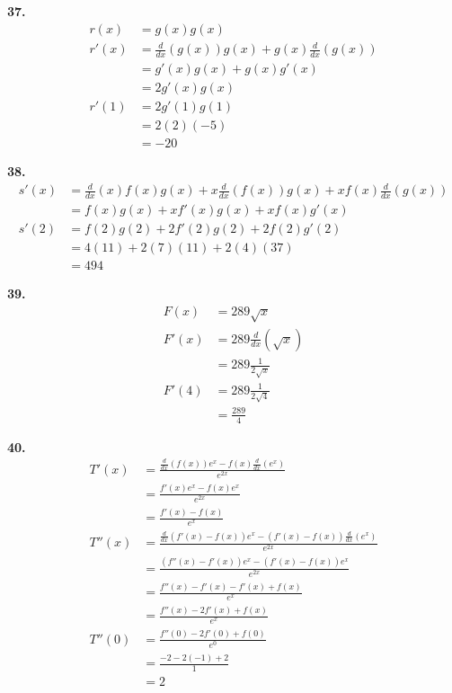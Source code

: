 \documentclass[10pt,oneside,]{book}
\theoremstyle{plain}
\theoremstyle{definition}
\numberwithin{equation}{section}
\newcommand{\fe}[2]{#1\mathopen{}\left(#2\right)\mathclose{}}
\newcommand{\fd}[1]{#1'}
\newcommand{\sd}[1]{#1''}
\newcommand{\lzoo}[2]{{\frac{d}{d#1}}{\left(#2\right)}}
\begin{document}
\par\smallskip
\noindent\textbf{37.}\quad{}\begin{align*}
\fe{r}{x}&=\fe{g}{x}\fe{g}{x}\\
\fe{\fd{r}}{x}&=\lzoo{x}{\fe{g}{x}}\fe{g}{x}+\fe{g}{x}\lzoo{x}{\fe{g}{x}}\\
&=\fe{\fd{g}}{x}\fe{g}{x}+\fe{g}{x}\fe{\fd{g}}{x}\\
&=2\fe{\fd{g}}{x}\fe{g}{x}\\
\fe{\fd{r}}{1}&=2\fe{\fd{g}}{1}\fe{g}{1}\\
&=2(2)(-5)\\
&=-20
\end{align*}%
\par\smallskip
\noindent\textbf{38.}\quad{}\begin{align*}
\fe{\fd{s}}{x}&=\lzoo{x}{x}\fe{f}{x}\fe{g}{x}+x\lzoo{x}{\fe{f}{x}}\fe{g}{x}+x\fe{f}{x}\lzoo{x}{\fe{g}{x}}\\
&=\fe{f}{x}\fe{g}{x}+x\fe{\fd{f}}{x}\fe{g}{x}+x\fe{f}{x}\fe{\fd{g}}{x}\\
\fe{\fd{s}}{2}&=\fe{f}{2}\fe{g}{2}+2\fe{\fd{f}}{2}\fe{g}{2}+2\fe{f}{2}\fe{\fd{g}}{2}\\
&=4(11)+2(7)(11)+2(4)(37)\\
&=494
\end{align*}%
\par\smallskip
\noindent\textbf{39.}\quad{}\begin{align*}
\fe{F}{x}&=289\sqrt{x}\\
\fe{\fd{F}}{x}&=289\lzoo{x}{\sqrt{x}}\\
&=289\frac{1}{2\sqrt{x}}\\
\fe{\fd{F}}{4}&=289\frac{1}{2\sqrt{4}}\\
&=\frac{289}{4}
\end{align*}%
\par\smallskip
\noindent\textbf{40.}\quad{}\begin{align*}
\fe{\fd{T}}{x}&=\frac{\lzoo{x}{\fe{f}{x}}e^x-\fe{f}{x}\lzoo{x}{e^x}}{e^{2x}}\\
&=\frac{\fe{\fd{f}}{x}e^x-\fe{f}{x}e^x}{e^{2x}}\\
&=\frac{\fe{\fd{f}}{x}-\fe{f}{x}}{e^x}\\
\fe{\sd{T}}{x}&=\frac{\lzoo{x}{\fe{\fd{f}}{x}-\fe{f}{x}}e^x-\left(\fe{\fd{f}}{x}-\fe{f}{x}\right)\lzoo{x}{e^x}}{e^{2x}}\\
&=\frac{\left(\fe{\sd{f}}{x}-\fe{\fd{f}}{x}\right)e^x-\left(\fe{\fd{f}}{x}-\fe{f}{x}\right)e^x}{e^{2x}}\\
&=\frac{\fe{\sd{f}}{x}-\fe{\fd{f}}{x}-\fe{\fd{f}}{x}+\fe{f}{x}}{e^x}\\
&=\frac{\fe{\sd{f}}{x}-2\fe{\fd{f}}{x}+\fe{f}{x}}{e^x}\\
\fe{\sd{T}}{0}&=\frac{\fe{\sd{f}}{0}-2\fe{\fd{f}}{0}+\fe{f}{0}}{e^0}\\
&=\frac{-2-2(-1)+2}{1}\\
&=2
\end{align*}%
\par\smallskip
\end{document}
